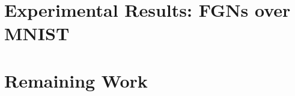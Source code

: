 \documentclass[12pt,oneside]{CUNY_PhD}
\begin{document}
\chapter{Experimental Results: FGNs over MNIST}

\chapter{Remaining Work}





\backmatter



\end{document}
